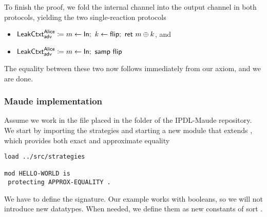 To finish the proof, we fold the internal channel into the output channel in both protocols, yielding the two single-reaction protocols
\begin{itemize}
\item $\mathsf{LeakCtxt}^{\mathsf{Alice}}_{\mathsf{adv}} \coloneqq m \leftarrow \mathsf{In}; \ k \leftarrow \mathsf{flip}; \ \mathsf{ret} \ m \oplus k$, and
\item $\mathsf{LeakCtxt}^{\mathsf{Alice}}_{\mathsf{adv}} \coloneqq m \leftarrow \mathsf{In}; \ \mathsf{samp} \ \mathsf{flip}$
\end{itemize}
The equality between these two now follows immediately from our axiom, and we are done.

\subsubsection{Maude implementation}

Assume we work in the file  placed in the 
 folder of the IPDL-Maude repository. We start by importing
the strategies and starting a new module that extends , which provides both exact and approximate equality
\begin{lstlisting}
load ../src/strategies

mod HELLO-WORLD is
 protecting APPROX-EQUALITY .

\end{lstlisting}

We have to define the signature.
Our example works with booleans, 
so we will not introduce new datatypes. 
When needed, we define them as new constants of sort .

